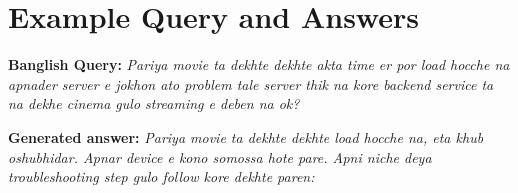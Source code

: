 \documentclass[sigconf]{acmart}
\begin{document}








\appendix

\section{Example Query and Answers}
\label{appendix:a}

\textbf{Banglish Query:} \textit{Pariya movie ta dekhte dekhte akta time er por load hocche na apnader server e jokhon ato problem tale server thik na kore backend service ta na dekhe cinema gulo streaming e deben na ok?}\newline

\noindent\textbf{Generated answer:} \textit{Pariya movie ta dekhte dekhte load hocche na, eta khub oshubhidar. Apnar device e kono somossa hote pare. Apni niche deya troubleshooting step gulo follow kore dekhte paren:}
\end{document}
